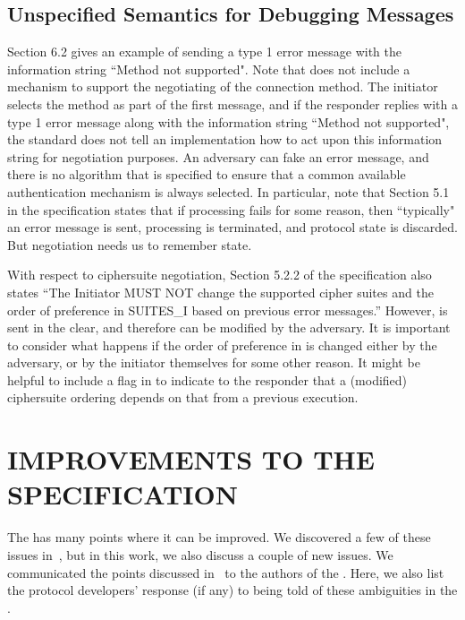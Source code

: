 \documentclass[runningheads]{llncs}
\begin{document}
\subsection{Unspecified Semantics for Debugging Messages}
Section 6.2 gives an example of sending a type 1 error message with the
information string ``Method not supported".
%
Note that \mEdhoc{} does not include a mechanism to support the
negotiating of the connection method.
%
The initiator selects the method as part of the first message, and if the
responder replies with a type 1 error message along with the information
string ``Method not supported", the standard does not tell an
implementation how to act upon this information string for negotiation
purposes.
%
An adversary can fake an error message, and there is no algorithm that is
specified to ensure that a common available authentication mechanism is
always selected.
%
In particular, note that Section 5.1 in the specification states that if processing
fails for some reason, then ``typically" an error message is sent, processing is
terminated, and protocol state is discarded.
%
But negotiation needs us to remember state.

With respect to ciphersuite negotiation, Section 5.2.2 of the specification also
states ``The Initiator MUST NOT change the supported cipher suites and
the order of preference in SUITES\_I based on previous error messages.''
%
However, \mSuites{} is sent in the clear, and therefore can be modified by the
adversary.
%
It is important to consider what happens if the order of preference in
\mSuites{} is changed either by the adversary, or by the initiator themselves
for some other reason.
%
It might be helpful to include a flag in \mMsgone{} to indicate to the
responder
that a (modified) ciphersuite ordering depends on that from a previous
execution.

\section{\uppercase{Improvements to the Specification}}
\label{sec:discussion}
The \mEdhoc{} \mSpec{} has many points where it can be improved.
%
We discovered a few of these issues in~\cite{Norr21}, but in this work,
we also discuss a couple of new issues.
%
We communicated the points discussed in~\cite{Norr21} to the authors of the
\mSpec{}.
%
Here, we also list the protocol developers' response (if any) to being told of these
ambiguities in the \mSpec{}.
\end{document}
